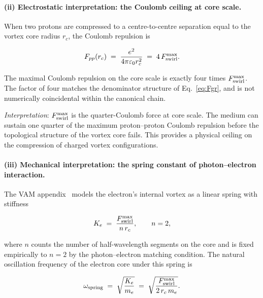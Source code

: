 \paragraph{(ii) Electrostatic interpretation: the Coulomb ceiling
at core scale.}

When two protons are compressed to a centre-to-centre separation
equal to the vortex core radius $r_c$, the Coulomb repulsion is

\begin{equation}
  F_{pp}(r_c)
  \;=\; \frac{e^2}{4\pi\varepsilon_0 r_c^2}
  \;=\; 4\,F_{\rm swirl}^{\max}.
  \label{eq:Coulomb-core}
\end{equation}

 The maximal Coulomb repulsion on the core scale
is exactly four times $F_{\rm swirl}^{\max}$.
The factor of four matches the denominator structure of
Eq.~\eqref{eq:Fgr}, and is not numerically coincidental within
the canonical chain.

 \textit{Interpretation}: $F_{\rm swirl}^{\max}$
is the quarter-Coulomb force at core scale. The medium can sustain
one quarter of the maximum proton--proton Coulomb repulsion before
the topological structure of the vortex core fails. This provides a
physical ceiling on the compression of charged vortex configurations.

\paragraph{(iii) Mechanical interpretation: the spring constant of
photon--electron interaction.}

The VAM appendix~\cite{VAMAppendix} models the electron's internal
vortex as a linear spring with stiffness

\begin{equation}
  K_e \;=\; \frac{F_{\rm swirl}^{\max}}{n\,r_c},
  \qquad n = 2,
  \label{eq:spring-K}
\end{equation}

\noindent
where $n$ counts the number of half-wavelength segments on the core
and is fixed empirically to $n = 2$ by the photon--electron matching
condition. The natural oscillation frequency of the electron core
under this spring is

\begin{equation}
  \omega_{\rm spring}
  \;=\; \sqrt{\frac{K_e}{m_e}}
  \;=\; \sqrt{\frac{F_{\rm swirl}^{\max}}{2\,r_c\,m_e}}.
  \label{eq:omega-spring}
\end{equation}

